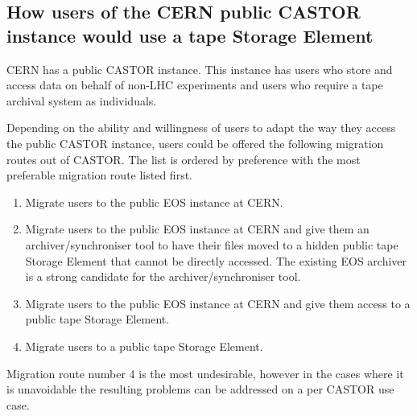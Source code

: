 \documentclass{article}
\begin{document}
\newpage
\subsection{How users of the CERN public CASTOR instance would use a tape Storage Element}
CERN has a public CASTOR instance.  This instance has users who store and access data on behalf of non-LHC experiments and users who require a tape archival system as individuals.

Depending on the ability and willingness of users to adapt the way they access the public CASTOR instance, users could be offered the following migration routes out of CASTOR.  The list is ordered by preference with the most preferable migration route listed first.
\begin{enumerate}
	\item Migrate users to the public EOS instance at CERN.
	\item Migrate users to the public EOS instance at CERN and give them an archiver/synchroniser tool to have their files moved to a hidden public tape Storage Element that cannot be  directly accessed.  The existing EOS archiver is a strong candidate for the archiver/synchroniser tool.
	\item Migrate users to the public EOS instance at CERN and give them access to a public tape Storage Element.
	\item Migrate users to a public tape Storage Element.
\end{enumerate} 

Migration route number 4 is the most undesirable, however in the cases where it is unavoidable the resulting problems can be addressed on a per CASTOR use case.
\end{document}
